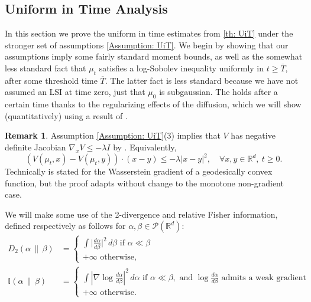 \documentclass[11pt,reqno]{amsart}
\numberwithin{equation}{section}
\theoremstyle{definition}
\newtheorem{remark}[theorem]{Remark}
\def\R{{\mathbb R}}
\newcommand{\fin}{\mathbb I}
\begin{document}
\subsection{Uniform in Time Analysis}
    In this section we prove the uniform in time estimates from \ref{th: UiT} under the stronger set of assumptions \ref{Assumption: UiT}.  
    We begin by showing that our assumptions imply some fairly standard moment bounds, as well as the somewhat less standard fact that $\mu_t$ satisfies a log-Sobolev inequality uniformly in $t \ge \overline{T}$, after some threshold time $\overline{T}$. The latter fact is less standard because we have not assumed an LSI at time zero, just that $\mu_0$ is subgaussian. The holds after a certain time thanks to the regularizing effects of the diffusion, which we will show (quantitatively) using a result of  \cite{Chen2021-ch}.
    
    \begin{remark}
    \label{rk: UiT LSI}
    Assumption \ref{Assumption: UiT}(3) implies that $V$ has negative definite Jacobian $\nabla_x  V \le -\lambda I$ by \cite[Proposition B.6]{GangboConvexity}. Equivalently,
    \begin{equation}
    (V(\mu_t,x)-V(\mu_t,y))\cdot (x-y) \le -\lambda |x-y|^2, \quad \forall x,y\in\R^d, \ t \ge 0. \label{remark:dissipation}
    \end{equation}
    Technically \cite[Proposition B.6]{GangboConvexity} is stated for the Wasserstein gradient of a geodesically convex function, but the proof adapts without change to the monotone non-gradient case.
\end{remark}
We will make some use of the 2-divergence and relative Fisher information, defined respectively as follows for $\alpha,\beta \in \mathcal P(\R^d)$:
\begin{align*}
    D_2(\alpha\,\|\,\beta) &=\begin{cases}
    \int \big|\frac{d\alpha}{d\beta}\big|^2\,d\beta \text{ if }\alpha \ll\beta \\
    +\infty \text{ otherwise,} \end{cases} \\
    \fin (\alpha\,\|\,\beta) &=\begin{cases}
        \int |\nabla \log \frac{d\alpha}{d\beta}|^2 \, d\alpha \text{  if } \alpha \ll \beta, \text{ and } \log \frac{d\alpha}{d\beta} \text{ admits a weak gradient} \\
        +\infty \text{ otherwise}.
    \end{cases}
\end{align*}
\end{document}
